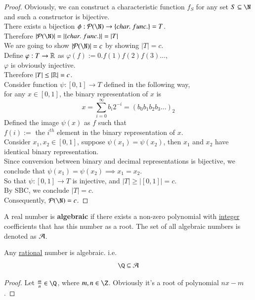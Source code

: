 \documentclass[10pt]{article}
\begin{document}
		\begin{proof}
			Obviously, we can construct a characteristic function $f_S$ for any set $S \subseteq \N$ and such a constructor is bijective. \\
			There exists a bijection $\phi: \mc{P}(\N) \to \{char.\ func.\} = T$. \\
			Therefore $|\mc{P}(\N)| = |\{char.\ func.\}| = |T|$ \\
			We are going to show $|\mc{P}(\N)| = c$ by showing $|T| = c$. \\
			Define $\varphi: T \to \mathbb{R}$ as $\varphi(f) := 0.f(1)f(2)f(3)\dots$, \\
			$\varphi$ is obviously injective.\\
			Therefore $|T| \leq |\mathbb{R}| = c$. \\
			\newline 
			Consider function $\psi: [0, 1]\to T$ defined in the following way, \\
			for any $x \in [0,1]$, the binary representation of $x$ is 
			\[
				x = \sum_{i=0}^{\infty} b_i 2^{-i} = (b_0 b_1 b_2 b_3 \dots )_2
			\]
			Defined the image $\psi(x)$ as $f$ such that \\
			$f(i) := $ the $i^{th}$ element in the binary representation of $x$. \\
			Consider $x_1, x_2 \in [0,1]$, suppose $\psi(x_1) = \psi(x_2)$, then $x_1$ and $x_2$ have identical binary representation. \\
			Since conversion between binary and decimal representations is bijective, we conclude that $\psi(x_1) = \psi(x_2) \implies x_1 = x_2$. \\
			So that $\psi:[0,1]\to T$ is injective, and $|T| \geq |[0,1]| = c$. \\
			By SBC, we conclude $|T| = c$. \\
			Consequently, $\mc{P}(\N) = c$.
		\end{proof}
		
		\begin{definition}
			A real number is \textbf{algebraic} if there exists a non-zero polynomial with \ul{integer} coefficients that has this number as a root. The set of all algebraic numbers is denoted as $\mathcal{{A}}$.
		\end{definition}
		
		\begin{theorem}
			Any \ul{rational} number is algebraic. i.e. 
			\[
				\Q \subseteq \mc{A}
			\]
		\end{theorem}
		\begin{proof}
			Let $\frac{m}{n} \in \Q$, where $m, n \in \Z$.
			Obviously it's a root of polynomial $nx - m$.
		\end{proof}
		
\end{document}
